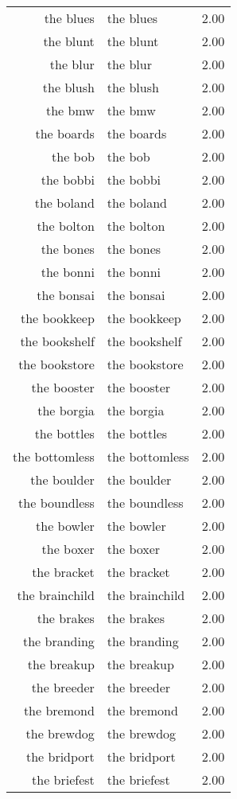 \begin{table}[ht]
\begin{tabular}{rlr}
  the blues & the blues & 2.00 \\ 
  the blunt & the blunt & 2.00 \\ 
  the blur & the blur & 2.00 \\ 
  the blush & the blush & 2.00 \\ 
  the bmw & the bmw & 2.00 \\ 
  the boards & the boards & 2.00 \\ 
  the bob & the bob & 2.00 \\ 
  the bobbi & the bobbi & 2.00 \\ 
  the boland & the boland & 2.00 \\ 
  the bolton & the bolton & 2.00 \\ 
  the bones & the bones & 2.00 \\ 
  the bonni & the bonni & 2.00 \\ 
  the bonsai & the bonsai & 2.00 \\ 
  the bookkeep & the bookkeep & 2.00 \\ 
  the bookshelf & the bookshelf & 2.00 \\ 
  the bookstore & the bookstore & 2.00 \\ 
  the booster & the booster & 2.00 \\ 
  the borgia & the borgia & 2.00 \\ 
  the bottles & the bottles & 2.00 \\ 
  the bottomless & the bottomless & 2.00 \\ 
  the boulder & the boulder & 2.00 \\ 
  the boundless & the boundless & 2.00 \\ 
  the bowler & the bowler & 2.00 \\ 
  the boxer & the boxer & 2.00 \\ 
  the bracket & the bracket & 2.00 \\ 
  the brainchild & the brainchild & 2.00 \\ 
  the brakes & the brakes & 2.00 \\ 
  the branding & the branding & 2.00 \\ 
  the breakup & the breakup & 2.00 \\ 
  the breeder & the breeder & 2.00 \\ 
  the bremond & the bremond & 2.00 \\ 
  the brewdog & the brewdog & 2.00 \\ 
  the bridport & the bridport & 2.00 \\ 
  the briefest & the briefest & 2.00 \\ 

\end{tabular}
\end{table}
